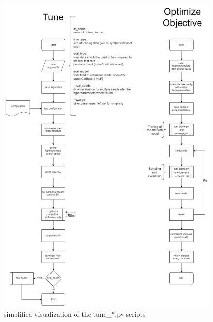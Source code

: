 \begin{figure}[H]
	\centering
	\includegraphics[width=\textwidth]{images/tune_optim-ORIGINAL.png}
	\caption[Tuning Script]{simplified visualization of the tune\_*.py scripts}
\end{figure}

